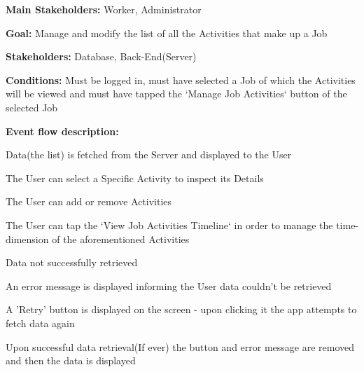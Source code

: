 			\noindent {}
			\begin{packed_item}
				\item \textbf{Main Stakeholders:} Worker, Administrator
				\item \textbf{Goal:} Manage and modify the list of all the Activities that make up a Job
				\item \textbf{Stakeholders: } Database, Back-End(Server)
				\item \textbf{Conditions: } Must be logged in, must have selected a Job of which the Activities will be viewed and must have tapped the `Manage Job Activities` button of the selected Job
				\item \textbf{Event flow description: }
				\begin{packed_enum}
					\item Data(the list) is fetched from the Server and displayed to the User
					\item The User can select a Specific Activity to inspect its Details
					\item The User can add or remove Activities
					\item The User can tap the `View Job Activities Timeline` in order to manage the time-dimension of the aforementioned Activities
				\end{packed_enum}
				
				\begin{packed_item}
					\item[1.a] Data not successfully retrieved
					\item[] \begin{packed_enum}
						\item An error message is displayed informing the User data couldn't be retrieved
						\item A 'Retry' button is displayed on the screen - upon clicking it the app attempts to fetch data again
						\item Upon successful data retrieval(If ever) the button and error message are removed and then the data is displayed
					\end{packed_enum}
				\end{packed_item}
			\end{packed_item}
			
